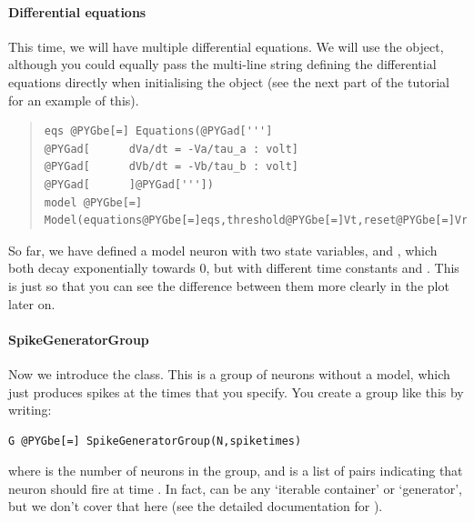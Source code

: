 \documentclass[letterpaper,10pt]{manual}
\begin{document}
\paragraph{Differential equations}

This time, we will have multiple differential equations. We will use the
\hyperlink{brian.Equations}{} object, although you could equally pass the multi-line string
defining the differential equations directly when initialising the \hyperlink{brian.Model}{}
object (see the next part of the tutorial for an example of this).
\begin{quote}

\begin{Verbatim}[commandchars=@\[\]]
eqs @PYGbe[=] Equations(@PYGad[''']
@PYGad[      dVa/dt = -Va/tau_a : volt]
@PYGad[      dVb/dt = -Vb/tau_b : volt]
@PYGad[      ]@PYGad['''])
model @PYGbe[=] Model(equations@PYGbe[=]eqs,threshold@PYGbe[=]Vt,reset@PYGbe[=]Vr)
\end{Verbatim}
\end{quote}

So far, we have defined a model neuron with two state variables, 
and , which both decay exponentially towards 0, but with different
time constants  and . This is just so that you can see
the difference between them more clearly in the plot later on.


\paragraph{SpikeGeneratorGroup}

Now we introduce the \hyperlink{brian.SpikeGeneratorGroup}{} class. This is a group of
neurons without a model, which just produces spikes at the times
that you specify. You create a group like this by writing:

\begin{Verbatim}[commandchars=@\[\]]
G @PYGbe[=] SpikeGeneratorGroup(N,spiketimes)
\end{Verbatim}

where  is the number of neurons in the group, and  is a
list of pairs  indicating that neuron  should fire at time .
In fact,  can be any `iterable container' or `generator',
but we don't cover that here (see the detailed documentation for
\hyperlink{brian.SpikeGeneratorGroup}{}).
\end{document}
